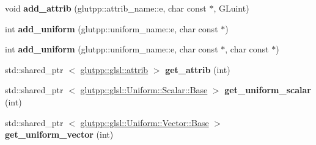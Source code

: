 \begin{DoxyCompactItemize}
\item 
\hypertarget{classglutpp_1_1glsl_1_1program_af2403d0061bcb6e7eff6fd0e27ef57cf}{void {\bfseries add\-\_\-attrib} (glutpp\-::attrib\-\_\-name\-::e, char const $\ast$, \-G\-Luint)}\label{classglutpp_1_1glsl_1_1program_af2403d0061bcb6e7eff6fd0e27ef57cf}

\item 
\hypertarget{classglutpp_1_1glsl_1_1program_a03e5e8b1fa8d6e46c7b49ed1ba67ed66}{int {\bfseries add\-\_\-uniform} (glutpp\-::uniform\-\_\-name\-::e, char const $\ast$)}\label{classglutpp_1_1glsl_1_1program_a03e5e8b1fa8d6e46c7b49ed1ba67ed66}

\item 
\hypertarget{classglutpp_1_1glsl_1_1program_a332a3612070f74fc2974c0d214fb0293}{int {\bfseries add\-\_\-uniform} (glutpp\-::uniform\-\_\-name\-::e, char const $\ast$, char const $\ast$)}\label{classglutpp_1_1glsl_1_1program_a332a3612070f74fc2974c0d214fb0293}

\item 
\hypertarget{classglutpp_1_1glsl_1_1program_ab77d4536050a8ee71796b3e12fd73ef8}{std\-::shared\-\_\-ptr\*
$<$ \hyperlink{classglutpp_1_1glsl_1_1attrib}{glutpp\-::glsl\-::attrib} $>$ {\bfseries get\-\_\-attrib} (int)}\label{classglutpp_1_1glsl_1_1program_ab77d4536050a8ee71796b3e12fd73ef8}

\item 
\hypertarget{classglutpp_1_1glsl_1_1program_a8428676476894db7104450b0d3b1c4ff}{std\-::shared\-\_\-ptr\*
$<$ \hyperlink{classglutpp_1_1glsl_1_1Uniform_1_1Scalar_1_1Base}{glutpp\-::glsl\-::\-Uniform\-::\-Scalar\-::\-Base} $>$ {\bfseries get\-\_\-uniform\-\_\-scalar} (int)}\label{classglutpp_1_1glsl_1_1program_a8428676476894db7104450b0d3b1c4ff}

\item 
\hypertarget{classglutpp_1_1glsl_1_1program_a5bf0b6975f699e5729ed79bd875d5aa2}{std\-::shared\-\_\-ptr\*
$<$ \hyperlink{classglutpp_1_1glsl_1_1Uniform_1_1Vector_1_1Base}{glutpp\-::glsl\-::\-Uniform\-::\-Vector\-::\-Base} $>$ {\bfseries get\-\_\-uniform\-\_\-vector} (int)}\label{classglutpp_1_1glsl_1_1program_a5bf0b6975f699e5729ed79bd875d5aa2}

\end{DoxyCompactItemize}
